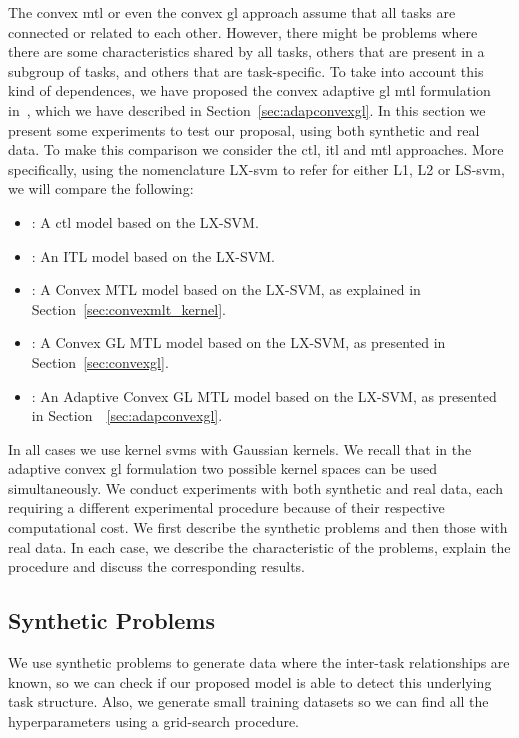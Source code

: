 The convex \acrshort{mtl} or even the convex \acrshort{gl} approach assume that all tasks are connected or related to each other. However, there might be problems where there are some characteristics shared by all tasks, others that are present in a subgroup of tasks, and others that are task-specific.
%
To take into account this kind of dependences, we have proposed the convex adaptive \acrshort{gl} \acrshort{mtl} formulation in~\cite{RuizAD21_hais}, which we have described in Section~\ref{sec:adapconvexgl}.
%
In this section we present some experiments to test our proposal, using both synthetic and real data. 
%
To make this comparison we consider the \acrshort{ctl}, \acrshort{itl} and \acrshort{mtl} approaches. More specifically, using the nomenclature LX-\acrshort{svm} to refer for either L1, L2 or LS-\acrshort{svm}, we will compare the following:
\begin{itemize}
    \item {}: A \acrshort{ctl} model based on the LX-SVM.
    \item {}: An ITL model based on the LX-SVM.
    \item {}: A Convex MTL model based on the LX-SVM, as explained in Section~\ref{sec:convexmlt_kernel}.
    \item {}: A Convex GL MTL model based on the LX-SVM, as presented in Section~\ref{sec:convexgl}.
    \item {}: An Adaptive Convex GL MTL model based on the LX-SVM, as presented in Section~~\ref{sec:adapconvexgl}.
\end{itemize}
In all cases we use kernel \acrshort{svms} with Gaussian kernels. We recall that in the adaptive convex \acrshort{gl} formulation two possible kernel spaces can be used simultaneously.
%
We conduct experiments with both synthetic and real data, each requiring a different experimental procedure because of their respective computational cost. We first describe the synthetic problems and then those with real data. In each case, we describe the characteristic of the problems, explain the procedure and discuss the corresponding results. 



\subsection{Synthetic Problems}
%
We use synthetic problems to generate data where the inter-task relationships are known, so we can check if our proposed model is able to detect this underlying task structure.
%
Also, we generate small training datasets so we can find all the hyperparameters using a grid-search procedure.

